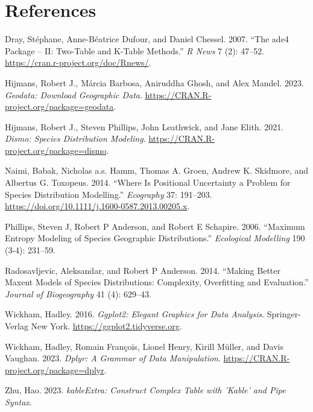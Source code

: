 \documentclass[
]{article}
\newlength{\cslhangindent}
\newlength{\cslentryspacingunit} %
\newenvironment{CSLReferences}[2] %
 {%
  \setlength{\parindent}{0pt}
  \ifodd #1
  \let\oldpar\par
  \def\par{\hangindent=\cslhangindent\oldpar}
  \fi
  \setlength{\parskip}{#2\cslentryspacingunit}
 }%
 {}
\begin{document}
\hypertarget{references}{%
\section*{References}\label{references}}

\hypertarget{refs}{}
\begin{CSLReferences}{1}{0}
\leavevmode{}%
Dray, Stéphane, Anne-Béatrice Dufour, and Daniel Chessel. 2007. {``The
{ade4} Package -- {II}: Two-Table and {K}-Table Methods.''} \emph{R
News} 7 (2): 47--52. \url{https://cran.r-project.org/doc/Rnews/}.

\leavevmode{}%
Hijmans, Robert J., Márcia Barbosa, Aniruddha Ghosh, and Alex Mandel.
2023. \emph{Geodata: Download Geographic Data}.
\url{https://CRAN.R-project.org/package=geodata}.

\leavevmode{}%
Hijmans, Robert J., Steven Phillips, John Leathwick, and Jane Elith.
2021. \emph{Dismo: Species Distribution Modeling}.
\url{https://CRAN.R-project.org/package=dismo}.

\leavevmode{}%
Naimi, Babak, Nicholas a.s. Hamm, Thomas A. Groen, Andrew K. Skidmore,
and Albertus G. Toxopeus. 2014. {``Where Is Positional Uncertainty a
Problem for Species Distribution Modelling.''} \emph{Ecography} 37:
191--203. \url{https://doi.org/10.1111/j.1600-0587.2013.00205.x}.

\leavevmode{}%
Phillips, Steven J, Robert P Anderson, and Robert E Schapire. 2006.
{``Maximum Entropy Modeling of Species Geographic Distributions.''}
\emph{Ecological Modelling} 190 (3-4): 231--59.

\leavevmode{}%
Radosavljevic, Aleksandar, and Robert P Anderson. 2014. {``Making Better
Maxent Models of Species Distributions: Complexity, Overfitting and
Evaluation.''} \emph{Journal of Biogeography} 41 (4): 629--43.

\leavevmode{}%
Wickham, Hadley. 2016. \emph{Ggplot2: Elegant Graphics for Data
Analysis}. Springer-Verlag New York.
\url{https://ggplot2.tidyverse.org}.

\leavevmode{}%
Wickham, Hadley, Romain François, Lionel Henry, Kirill Müller, and Davis
Vaughan. 2023. \emph{Dplyr: A Grammar of Data Manipulation}.
\url{https://CRAN.R-project.org/package=dplyr}.

\leavevmode{}%
Zhu, Hao. 2023. \emph{kableExtra: Construct Complex Table with 'Kable'
and Pipe Syntax}.

\end{CSLReferences}
\end{document}
